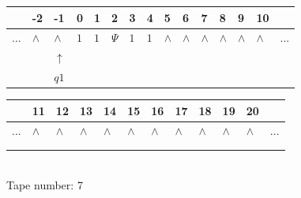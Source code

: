 \documentclass[11pt]{article}
\begin{document}
\begin{table}[H]
\centering
\begin{tabular}{lllllllllllllll}
 & -2 & -1 & 0 & 1 & 2 & 3 & 4 & 5 & 6 & 7 & 8 & 9 & 10 & \\
\hline
$...$ & \multicolumn{1}{|l|}{$\wedge$} & \multicolumn{1}{|l|}{$\wedge$} & \multicolumn{1}{|l|}{$1$} & \multicolumn{1}{|l|}{$1$} & \multicolumn{1}{|l|}{$\Psi$} & \multicolumn{1}{|l|}{$1$} & \multicolumn{1}{|l|}{$1$} & \multicolumn{1}{|l|}{$\wedge$} & \multicolumn{1}{|l|}{$\wedge$} & \multicolumn{1}{|l|}{$\wedge$} & \multicolumn{1}{|l|}{$\wedge$} & \multicolumn{1}{|l|}{$\wedge$} & \multicolumn{1}{|l|}{$\wedge$} & $...$\\
\hline
&  & $\uparrow$ &  &  &  &  &  &  &  &  &  &  &  &  \\
&  & $ q1 $ &  &  &  &  &  &  &  &  &  &  &  &  \\
\end{tabular}
\begin{tabular}{llllllllllll}
 & 11 & 12 & 13 & 14 & 15 & 16 & 17 & 18 & 19 & 20 & \\
\hline
$...$ & \multicolumn{1}{|l|}{$\wedge$} & \multicolumn{1}{|l|}{$\wedge$} & \multicolumn{1}{|l|}{$\wedge$} & \multicolumn{1}{|l|}{$\wedge$} & \multicolumn{1}{|l|}{$\wedge$} & \multicolumn{1}{|l|}{$\wedge$} & \multicolumn{1}{|l|}{$\wedge$} & \multicolumn{1}{|l|}{$\wedge$} & \multicolumn{1}{|l|}{$\wedge$} & \multicolumn{1}{|l|}{$\wedge$} & $...$\\
\hline
&  &  &  &  &  &  &  &  &  &  &  \\
&  &  &  &  &  &  &  &  &  &  &  \\
\end{tabular}
\\
Tape number: 7
\noindent\makebox[\linewidth]{\hdashrule{\textwidth}{1pt}{1pt}}\end{table}
\clearpage
\end{document}
